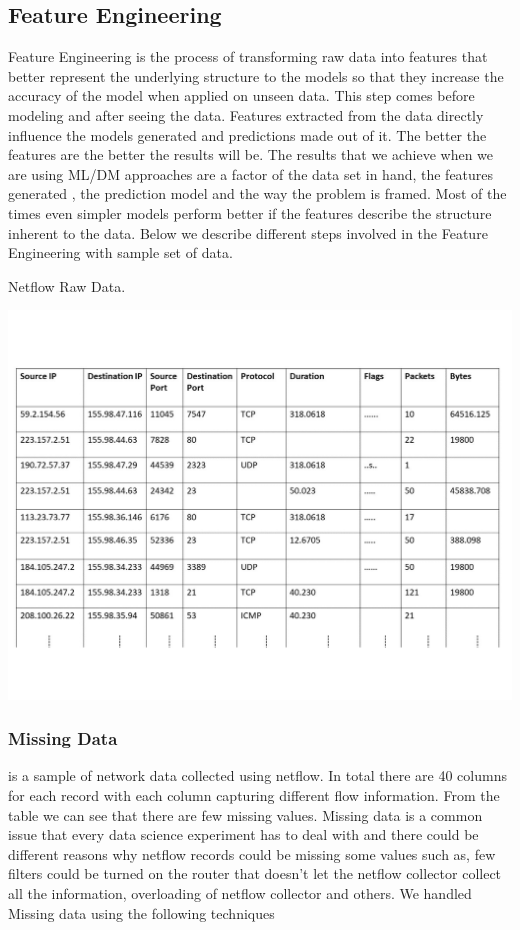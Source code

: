 \subsection{Feature Engineering}

Feature Engineering is the process of transforming raw
data into features that better represent the underlying structure to the models so that they increase the accuracy of the model when applied on unseen data. This step comes before modeling and after seeing the data.
Features extracted from the data directly influence the models generated and predictions made out of it. The better the features are the better the results will be. The results that we achieve when we are using ML/DM approaches are a factor of the data set in hand, the features generated , the prediction model and the way the problem is framed. Most of the times even simpler models perform better if the features describe the structure inherent to the data. 
Below we describe different steps involved in the Feature Engineering with sample set of data.
\begin{table}[b]
	\caption{Netflow Raw Data.}%
	\centerline{\includegraphics[scale = 0.6]{raw_data.pdf}}
	
\end{table}
 
\subsubsection{Missing Data} 

 is a sample of network data collected using netflow. In total there are 40 columns for each record with each column capturing different flow information. From the table we can see that there are few missing values. Missing data is a common issue that every data science experiment has to deal with and there could be different reasons why netflow records could be missing some values such as, few filters could be turned on the router that doesn't let the netflow collector collect all the information, overloading of netflow collector and others. We handled Missing data using the following techniques 

